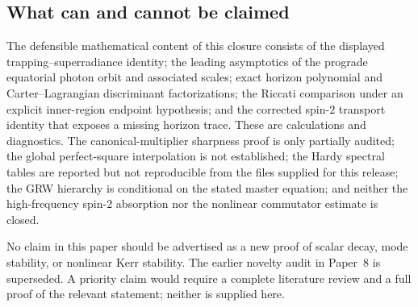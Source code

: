 \documentclass[11pt,a4paper]{article}
\theoremstyle{remark}
\theoremstyle{definition}
\begin{document}
\subsection{What can and cannot be claimed}

The defensible mathematical content of this closure consists of the displayed trapping--superradiance identity; the leading asymptotics of the prograde equatorial photon orbit and associated scales; exact horizon polynomial and Carter--Lagrangian discriminant factorizations; the Riccati comparison under an explicit inner-region endpoint hypothesis; and the corrected spin-$2$ transport identity that exposes a missing horizon trace. These are calculations and diagnostics. The canonical-multiplier sharpness proof is only partially audited; the global perfect-square interpolation is not established; the Hardy spectral tables are reported but not reproducible from the files supplied for this release; the GRW hierarchy is conditional on the stated master equation; and neither the high-frequency spin-$2$ absorption nor the nonlinear commutator estimate is closed.

No claim in this paper should be advertised as a new proof of scalar decay, mode stability, or nonlinear Kerr stability. The earlier novelty audit in Paper~8 is superseded. A priority claim would require a complete literature review and a full proof of the relevant statement; neither is supplied here.
\end{document}
